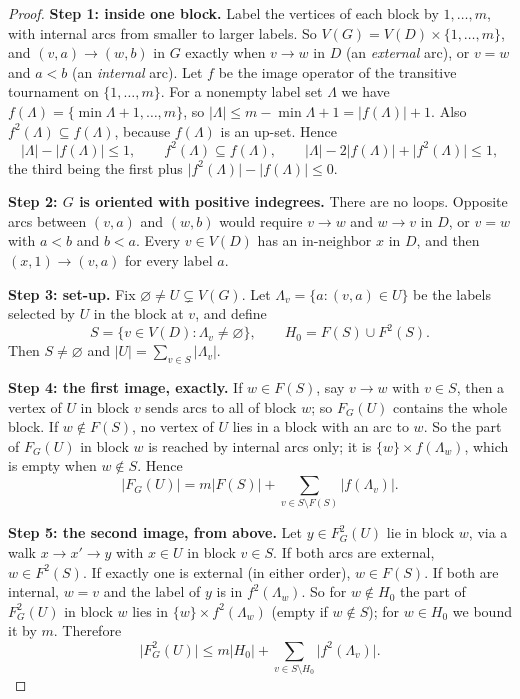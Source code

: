 \documentclass[11pt]{article}
\theoremstyle{remark}
\newcommand{\abs}[1]{\lvert #1\rvert}
\newcommand{\step}[1]{\par\medskip\noindent\textbf{#1}\enspace}
\begin{document}
\begin{proof}
\step{Step 1: inside one block.}
Label the vertices of each block by $1,\ldots,m$, with internal arcs from
smaller to larger labels.  So $V(G)=V(D)\times\{1,\dots,m\}$, and
$(v,a)\to(w,b)$ in $G$ exactly when $v\to w$ in $D$ (an \emph{external} arc),
or $v=w$ and $a<b$ (an \emph{internal} arc).
Let $f$ be the image operator of the transitive tournament on
$\{1,\dots,m\}$.  For a nonempty label set $\Lambda$ we have
$f(\Lambda)=\{\min\Lambda+1,\ldots,m\}$, so
$\abs\Lambda\le m-\min\Lambda+1=\abs{f(\Lambda)}+1$.  Also
$f^2(\Lambda)\subseteq f(\Lambda)$, because $f(\Lambda)$ is an up-set.  Hence
\begin{equation}
\label{eq:internal-block-bound}
  \abs{\Lambda}-\abs{f(\Lambda)}\le1,\qquad
  f^2(\Lambda)\subseteq f(\Lambda),\qquad
  \abs{\Lambda}-2\abs{f(\Lambda)}+\abs{f^2(\Lambda)}\le1,
\end{equation}
the third being the first plus
$\abs{f^2(\Lambda)}-\abs{f(\Lambda)}\le0$.

\step{Step 2: $G$ is oriented with positive indegrees.}
There are no loops.  Opposite arcs between $(v,a)$ and $(w,b)$ would
require $v\to w$ and $w\to v$ in $D$, or $v=w$ with $a<b$ and $b<a$.
Every $v\in V(D)$ has an in-neighbor $x$ in $D$, and then
$(x,1)\to(v,a)$ for every label $a$.

\step{Step 3: set-up.}
Fix $\varnothing\ne U\subsetneq V(G)$.  Let
$\Lambda_v=\{a:(v,a)\in U\}$ be the labels selected by $U$ in the block at
$v$, and define
\[
  S=\{v\in V(D):\Lambda_v\ne\varnothing\},\qquad
  H_0=F(S)\cup F^2(S).
\]
Then $S\neq\varnothing$ and $\abs U=\sum_{v\in S}\abs{\Lambda_v}$.

\step{Step 4: the first image, exactly.}
If $w\in F(S)$, say $v\to w$ with $v\in S$, then a vertex of $U$ in block $v$
sends arcs to all of block $w$; so $F_G(U)$ contains the whole block.
If $w\notin F(S)$, no vertex of $U$ lies in a block with an arc to $w$.
So the part of $F_G(U)$ in block $w$ is reached by internal arcs only; it
is $\{w\}\times f(\Lambda_w)$, which is empty when $w\notin S$.  Hence
\[
  \abs{F_G(U)}=m\abs{F(S)}
     +\sum_{v\in S\setminus F(S)}\abs{f(\Lambda_v)}.
\]

\step{Step 5: the second image, from above.}
Let $y\in F_G^2(U)$ lie in block $w$, via a walk $x\to x'\to y$ with $x\in U$
in block $v\in S$.  If both arcs are external, $w\in F^2(S)$.  If exactly
one is external (in either order), $w\in F(S)$.  If both are internal,
$w=v$ and the label of $y$ is in $f^2(\Lambda_w)$.  So for $w\notin H_0$ the
part of $F_G^2(U)$ in block $w$ lies in $\{w\}\times f^2(\Lambda_w)$ (empty
if $w\notin S$); for $w\in H_0$ we bound it by $m$.  Therefore
\[
  \abs{F_G^2(U)}\le m\abs{H_0}
     +\sum_{v\in S\setminus H_0}\abs{f^2(\Lambda_v)}.
\]


\end{proof}
\end{document}
